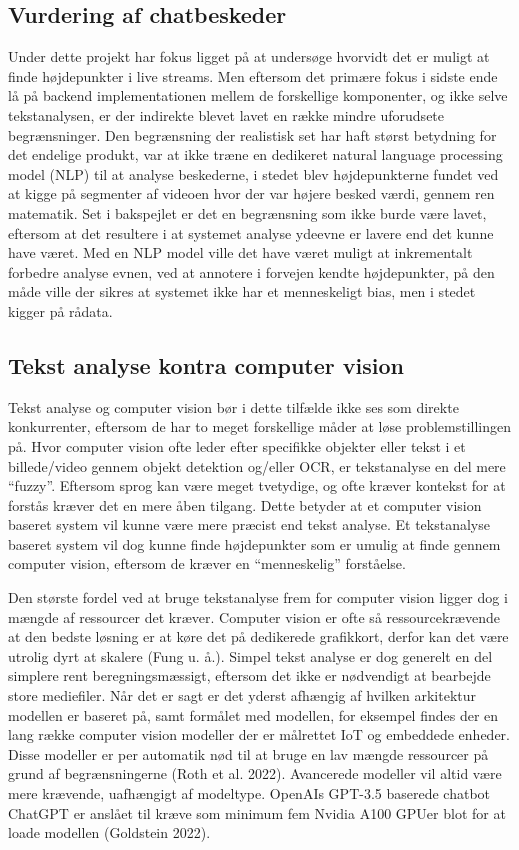 \documentclass{article}
\begin{document}
\subsection{Vurdering af chatbeskeder}
Under dette projekt har fokus ligget på at undersøge hvorvidt det er muligt at finde højdepunkter i live streams. Men eftersom det primære fokus i sidste ende lå på backend implementationen mellem de forskellige komponenter, og ikke selve tekstanalysen, er der indirekte blevet lavet en række mindre uforudsete begrænsninger. Den begrænsning der realistisk set har haft størst betydning for det endelige produkt, var at ikke træne en dedikeret natural language processing model (NLP) til at analyse beskederne, i stedet blev højdepunkterne fundet ved at kigge på segmenter af videoen hvor der var højere besked værdi, gennem ren matematik. Set i bakspejlet er det en begrænsning som ikke burde være lavet, eftersom at det resultere i at systemet analyse ydeevne er lavere end det kunne have været. Med en NLP model ville det have været muligt at inkrementalt forbedre analyse evnen, ved at annotere i forvejen kendte højdepunkter, på den måde ville der sikres at systemet ikke har et menneskeligt bias, men i stedet kigger på rådata.

\subsection{Tekst analyse kontra computer vision  }
Tekst analyse og computer vision bør i dette tilfælde ikke ses som direkte konkurrenter, eftersom de har to meget forskellige måder at løse problemstillingen på. Hvor computer vision ofte leder efter specifikke objekter eller tekst i et billede/video gennem objekt detektion og/eller OCR, er tekstanalyse en del mere “fuzzy”. Eftersom sprog kan være meget tvetydige, og ofte kræver kontekst for at forstås kræver det en mere åben tilgang. Dette betyder at et computer vision baseret system vil kunne være mere præcist end tekst analyse. Et tekstanalyse baseret system vil dog kunne finde højdepunkter som er umulig at finde gennem computer vision, eftersom de kræver en “menneskelig” forståelse.

Den største fordel ved at bruge tekstanalyse frem for computer vision ligger dog i mængde af ressourcer det kræver. Computer vision er ofte så ressourcekrævende at den bedste løsning er at køre det på dedikerede grafikkort, derfor kan det være utrolig dyrt at skalere (Fung u. å.). Simpel tekst analyse er dog generelt en del simplere rent beregningsmæssigt, eftersom det ikke er nødvendigt at bearbejde store mediefiler. Når det er sagt er det yderst afhængig af hvilken arkitektur modellen er baseret på, samt formålet med modellen, for eksempel findes der en lang række computer vision modeller der er målrettet IoT og embeddede enheder. Disse modeller er per automatik nød til at bruge en lav mængde ressourcer på grund af begrænsningerne (Roth et al. 2022). Avancerede modeller vil altid være mere krævende, uafhængigt af modeltype. OpenAIs GPT-3.5 baserede chatbot ChatGPT er anslået til kræve som minimum fem Nvidia A100 GPUer blot for at loade modellen (Goldstein 2022).
\end{document}
